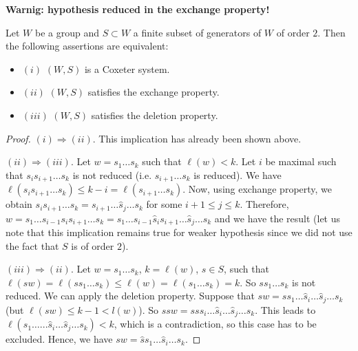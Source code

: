 \textbf{Warnig: hypothesis reduced in the exchange property!}


\begin{theorem} [Matsumoto]
Let $W$ be a group and $S \subset W$ a finite subset of generators of $W$ of order $2$. Then the following assertions are equivalent:
\begin{itemize}
\item $(i)$ $(W, S)$ is a Coxeter system.
\item $(ii)$ $(W, S)$ satisfies the exchange property.
\item $(iii)$ $(W,S)$ satisfies the deletion property.
\end{itemize}
\end{theorem}
\begin{proof}
$(i) \Rightarrow (ii)$. This implication has already been shown above.

$(ii) \Rightarrow (iii)$. Let $w= s_1 \ldots s_k$ such that $\ell(w) < k$. Let $i$ be maximal such that $s_i s_{i+1} \ldots s_k$ is not reduced (i.e. $s_{i+1} \ldots s_k$ is reduced). We have $\ell (s_i s_{i+1} \ldots s_k) \le k- i = \ell (s_{i+1} \ldots s_k)$. Now, using exchange property, we obtain $s_i s_{i+1} \ldots s_k = s_{i+1} \ldots \hat{s}_j \ldots s_k$ for some $i+1 \le j \le k$. Therefore, $w = s_1 \ldots s_{i-1} s_i s_{i+1} \ldots s_k = s_1 \ldots s_{i-1} \hat{s}_i s_{i+1} \ldots \hat{s}_j \ldots s_k$ and we have the result (let us note that this implication remains true for weaker hypothesis since we did not use the fact that $S$ is of order $2$).

$(iii) \Rightarrow (ii)$. Let $w= s_1 \ldots s_k$, $k = \ell (w)$, $s\in S$, such that $\ell (s w) = \ell (s s_1 \ldots s_k) \le \ell (w) = \ell (s_1 \ldots s_k ) = k$. So $s s_1 \ldots s_k$ is not reduced. We can apply the deletion property. Suppose that $s w = s s_1 \ldots \hat{s}_i \ldots \hat{s}_j \ldots s_k $ (but $\ell (sw) \le k-1 < l(w)$). So $s s w = s s s_i \ldots \hat{s}_i \ldots {\hat{s}_j} \ldots s_k$. This leads to $\ell (s_1 \ldots ... \hat{s}_i \ldots \hat{s}_j \ldots s_k ) < k$, which is a contradiction, so this case has to be excluded. Hence, we have $s w = \hat{s} s_1 \ldots \hat{s}_i  \ldots s_k $.


\end{proof}
